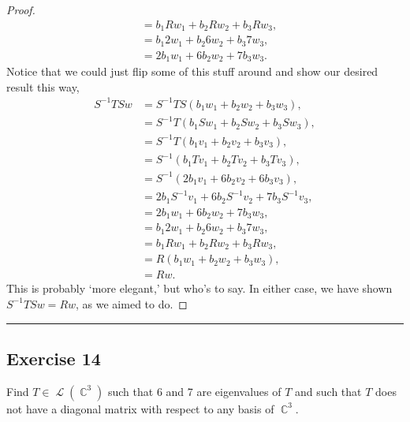 \documentclass[letterpaper, 12pt]{amsart}
\DeclareMathOperator{\C}{\mathbb{C}}				%
\DeclareMathOperator{\Ell}{\mathscr{L}}				%
\theoremstyle{definition}  							%
\begin{document}
\begin{proof}
\begin{align*}
				&= b_{1}Rw_{1} + b_{2}Rw_{2} + b_{3}Rw_{3}, \\
				&= b_{1}2w_{1} + b_{2}6w_{2} + b_{3}7w_{3}, \\
				&= 2b_{1}w_{1} + 6b_{2}w_{2} + 7b_{3}w_{3}.
			\end{align*}
		Notice that we could just flip some of this stuff around and show our desired result this way,
			\begin{align*}
				S^{-1}TSw &= S^{-1}TS(b_{1}w_{1} + b_{2}w_{2} + b_{3}w_{3}), \\
				&= S^{-1} T(b_{1}Sw_{1} + b_{2}Sw_{2} + b_{3}Sw_{3}), \\
				&= S^{-1} T(b_{1}v_{1} + b_{2}v_{2} + b_{3}v_{3}), \\
				&= S^{-1}(b_{1}Tv_{1} + b_{2}Tv_{2} + b_{3}Tv_{3}), \\
				&= S^{-1}(2b_{1}v_{1} + 6b_{2}v_{2} + 6b_{3}v_{3}), \\
				&= 2b_{1}S^{-1}v_{1} + 6b_{2}S^{-1}v_{2} + 7b_{3}S^{-1}v_{3}, \\
				&= 2b_{1}w_{1} + 6b_{2}w_{2} + 7b_{3}w_{3}, \\
				&= b_{1}2w_{1} + b_{2}6w_{2} + b_{3}7w_{3}, \\
				&= b_{1}Rw_{1} + b_{2}Rw_{2} + b_{3}Rw_{3}, \\
				&= R(b_{1}w_{1} + b_{2}w_{2} + b_{3}w_{3}), \\
				&= Rw.
			\end{align*}
		This is probably `more elegant,' but who's to say.
		In either case, we have shown $S^{-1}TSw = Rw$, as we aimed to do.
		\end{proof}

		\vspace*{2mm}
		\hrule
		\vspace*{2mm}

		\subsection*{Exercise 14}
		Find $T \in \Ell(\C^{3})$ such that 6 and 7 are eigenvalues of $T$ and such that $T$ does not have a diagonal matrix with respect to any basis of $\C^{3}$.
		\vspace*{3mm}
\end{document}
